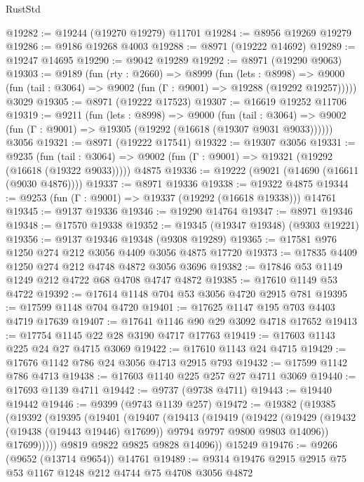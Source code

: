 \begin{lexlean}{RustStd}
\begin{coremodule}
@19282 := @19244 (@19270 @19279) @11701
@19284 := @8956 @19269 @19279
@19286 := @9186 @19268 @4003
@19288 := @8971 (@19222 @14692)
@19289 := @19247 @14695
@19290 := @9042 @19289
@19292 := @8971 (@19290 @9063)
@19303 := @9189
    (fun (rty : @2660) =>
    @8999
      (fun (lets : @8998) =>
      @9000 (fun (tail : @3064) => @9002 (fun (Γ : @9001) => @19288 (@19292 @19257)))))
    @3029
@19305 := @8971 (@19222 @17523)
@19307 := @16619 @19252 @11706
@19319 := @9211
    (fun (lets : @8998) =>
    @9000
      (fun (tail : @3064) =>
      @9002 (fun (Γ : @9001) => @19305 (@19292 (@16618 (@19307 @9031 @9033))))))
    @3056
@19321 := @8971 (@19222 @17541)
@19322 := @19307 @3056
@19331 := @9235
    (fun (tail : @3064) => @9002 (fun (Γ : @9001) => @19321 (@19292 (@16618 (@19322 @9033)))))
    @4875
@19336 := @19222 (@9021 (@14690 (@16611 (@9030 @4876))))
@19337 := @8971 @19336
@19338 := @19322 @4875
@19344 := @9253 (fun (Γ : @9001) => @19337 (@19292 (@16618 @19338))) @14761
@19345 := @9137 @19336
@19346 := @19290 @14764
@19347 := @8971 @19346
@19348 := @17570 @19338
@19352 := @19345 (@19347 @19348) (@9303 @19221)
@19356 := @9137 @19346 @19348 (@9308 @19289)
@19365 := @17581 @976 @1250 @274 @212 @3056 @4409 @3056 @4875 @17720
@19373 := @17835 @4409 @1250 @274 @212 @4748 @4872 @3056 @3696
@19382 := @17846 @53 @1149 @1249 @212 @4722 @68 @4708 @4747 @4872
@19385 := @17610 @1149 @53 @4722
@19392 := @17614 @1148 @704 @53 @3056 @4720 @2915 @781
@19395 := @17599 @1148 @704 @4720
@19401 := @17625 @1147 @195 @703 @4403 @4719 @17639
@19407 := @17641 @1146 @90 @29 @3092 @4718 @17652
@19413 := @17754 @1145 @22 @28 @3190 @4717 @17763
@19419 := @17603 @1143 @225 @24 @27 @4715 @3069
@19422 := @17610 @1143 @24 @4715
@19429 := @17676 @1142 @786 @24 @3056 @4713 @2915 @793
@19432 := @17599 @1142 @786 @4713
@19438 := @17603 @1140 @225 @257 @27 @4711 @3069
@19440 := @17693 @1139 @4711
@19442 := @9737 (@9738 @4711)
@19443 := @19440 @19442
@19446 := @9399 (@9743 @1139 @257)
@19472 := @19382
    (@19385
      (@19392
        (@19395
          (@19401
            (@19407
              (@19413
                (@19419
                  (@19422
                    (@19429
                      (@19432 (@19438 (@19443 @19446) @17699))
                      @9794
                      @9797
                      @9800
                      @9803
                      @14096))
                  @17699)))))
        @9819
        @9822
        @9825
        @9828
        @14096))
    @15249
@19476 := @9266 (@9652 (@13714 @9654)) @14761
@19489 := @9314 @19476 @2915 @2915 @75 @53 @1167 @1248 @212 @4744 @75 @4708 @3056 @4872

\end{coremodule}
\end{lexlean}
